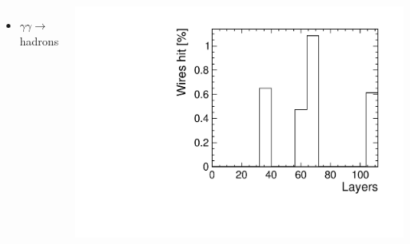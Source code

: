 \documentclass[final,xcolor={dvipsnames,svgnames,x11names,table}]{beamer}
\begin{document}
\begin{frame}
\begin{textblock}{80}
\begin{tcolorbox}[title=3 main sources of beam-induced backgrounds at the top stage]
\begin{columns}
    \begin{itemize}
      \item $\gamma\gamma\rightarrow$ hadrons
    \end{itemize}
    \centering
    \includegraphics[width=\textwidth]{Figures/SR_top}

  \end{columns}

  \end{tcolorbox}
\end{textblock}

\end{frame}
\end{document}
